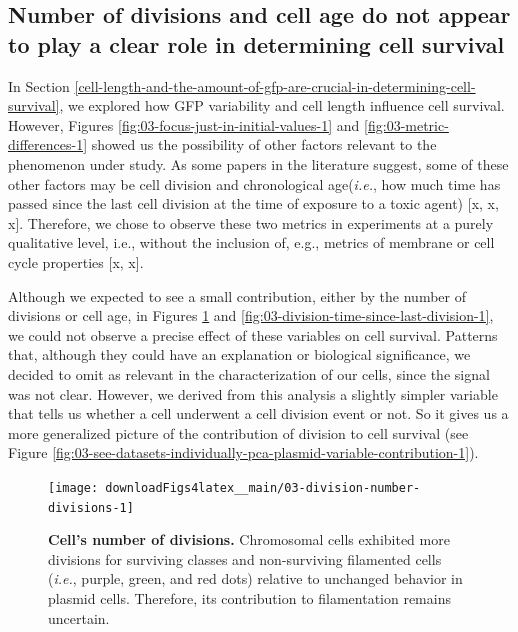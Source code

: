 \documentclass[a4paper, nobind]{templates/ociamthesis}
\begin{document}
\hypertarget{number-of-divisions-and-cell-age-do-not-appear-to-play-a-clear-role-in-determining-cell-survival}{%
\subsection{Number of divisions and cell age do not appear to play a clear role in determining cell survival}\label{number-of-divisions-and-cell-age-do-not-appear-to-play-a-clear-role-in-determining-cell-survival}}

In Section \ref{cell-length-and-the-amount-of-gfp-are-crucial-in-determining-cell-survival}, we explored how GFP variability and cell length influence cell survival.
However, Figures \ref{fig:03-focus-just-in-initial-values-1} and \ref{fig:03-metric-differences-1} showed us the possibility of other factors relevant to the phenomenon under study.
As some papers in the literature suggest, some of these other factors may be cell division and chronological age(\emph{i.e.}, how much time has passed since the last cell division at the time of exposure to a toxic agent) {[}x, x, x{]}.
Therefore, we chose to observe these two metrics in experiments at a purely qualitative level, i.e., without the inclusion of, e.g., metrics of membrane or cell cycle properties {[}x, x{]}.

Although we expected to see a small contribution, either by the number of divisions or cell age, in Figures \ref{fig:03-division-number-divisions-1} and \ref{fig:03-division-time-since-last-division-1}, we could not observe a precise effect of these variables on cell survival.
Patterns that, although they could have an explanation or biological significance, we decided to omit as relevant in the characterization of our cells, since the signal was not clear.
However, we derived from this analysis a slightly simpler variable that tells us whether a cell underwent a cell division event or not.
So it gives us a more generalized picture of the contribution of division to cell survival (see Figure \ref{fig:03-see-datasets-individually-pca-plasmid-variable-contribution-1}).





\begin{figure}[H]
\texttt{[image: downloadFigs4latex\_\_main/03-division-number-divisions-1]} \caption[Cell's number of divisions.]{\textbf{Cell's number of divisions.} Chromosomal cells exhibited more divisions for surviving classes and non-surviving filamented cells (\emph{i.e.}, purple, green, and red dots) relative to unchanged behavior in plasmid cells. Therefore, its contribution to filamentation remains uncertain.}\label{fig:03-division-number-divisions-1}
\end{figure}
\end{document}
